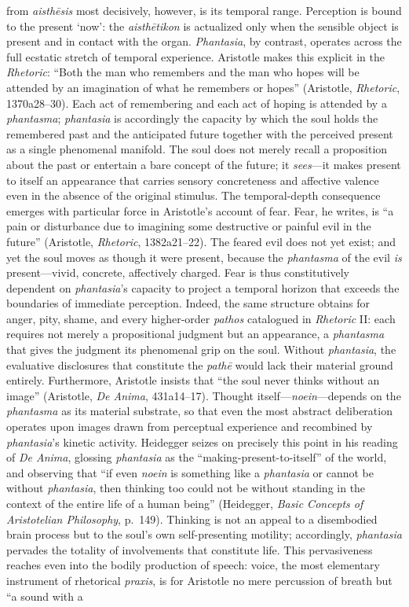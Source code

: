 from \textit{aisth\={e}sis} most decisively, however, is its temporal range. Perception is bound to the present `now': the \textit{aisth\={e}tikon} is actualized only when the sensible object is present and in contact with the organ. \textit{Phantasia}, by contrast, operates across the full ecstatic stretch of temporal experience. Aristotle makes this explicit in the \textit{Rhetoric}: ``Both the man who remembers and the man who hopes will be attended by an imagination of what he remembers or hopes'' (Aristotle, \textit{Rhetoric}, 1370a28--30). Each act of remembering and each act of hoping is attended by a \textit{phantasma}; \textit{phantasia} is accordingly the capacity by which the soul holds the remembered past and the anticipated future together with the perceived present as a single phenomenal manifold. The soul does not merely recall a proposition about the past or entertain a bare concept of the future; it \textit{sees}---it makes present to itself an appearance that carries sensory concreteness and affective valence even in the absence of the original stimulus. The temporal-depth consequence emerges with particular force in Aristotle's account of fear. Fear, he writes, is ``a pain or disturbance due to imagining some destructive or painful evil in the future'' (Aristotle, \textit{Rhetoric}, 1382a21--22). The feared evil does not yet exist; and yet the soul moves as though it were present, because the \textit{phantasma} of the evil \textit{is} present---vivid, concrete, affectively charged. Fear is thus constitutively dependent on \textit{phantasia}'s capacity to project a temporal horizon that exceeds the boundaries of immediate perception. Indeed, the same structure obtains for anger, pity, shame, and every higher-order \textit{pathos} catalogued in \textit{Rhetoric} II: each requires not merely a propositional judgment but an appearance, a \textit{phantasma} that gives the judgment its phenomenal grip on the soul. Without \textit{phantasia}, the evaluative disclosures that constitute the \textit{path\={e}} would lack their material ground entirely. Furthermore, Aristotle insists that ``the soul never thinks without an image'' (Aristotle, \textit{De Anima}, 431a14--17). Thought itself---\textit{noein}---depends on the \textit{phantasma} as its material substrate, so that even the most abstract deliberation operates upon images drawn from perceptual experience and recombined by \textit{phantasia}'s kinetic activity. Heidegger seizes on precisely this point in his reading of \textit{De Anima}, glossing \textit{phantasia} as the ``making-present-to-itself'' of the world, and observing that ``if even \textit{noein} is something like a \textit{phantasia} or cannot be without \textit{phantasia}, then thinking too could not be without standing in the context of the entire life of a human being'' (Heidegger, \textit{Basic Concepts of Aristotelian Philosophy}, p.~149). Thinking is not an appeal to a disembodied brain process but to the soul's own self-presenting motility; accordingly, \textit{phantasia} pervades the totality of involvements that constitute life. This pervasiveness reaches even into the bodily production of speech: voice, the most elementary instrument of rhetorical \textit{praxis}, is for Aristotle no mere percussion of breath but ``a sound with a 